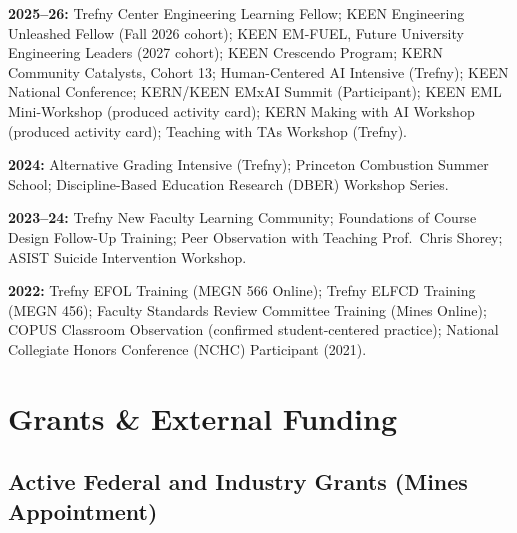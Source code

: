 \documentclass[11pt,letterpaper]{article}
\begin{document}
\noindent\textbf{2025--26:} Trefny Center Engineering Learning Fellow; KEEN Engineering
Unleashed Fellow (Fall 2026 cohort); KEEN EM-FUEL, Future University Engineering Leaders
(2027 cohort); KEEN Crescendo
Program; KERN Community Catalysts, Cohort 13; Human-Centered AI Intensive (Trefny); KEEN National Conference; KERN/KEEN
EMxAI Summit (Participant); KEEN EML Mini-Workshop (produced activity card); KERN Making
with AI Workshop (produced activity card); Teaching with TAs Workshop (Trefny).

\medskip
\noindent\textbf{2024:} Alternative Grading Intensive (Trefny); Princeton Combustion
Summer School; Discipline-Based Education Research (DBER) Workshop Series.

\medskip
\noindent\textbf{2023--24:} Trefny New Faculty Learning Community; Foundations of Course
Design Follow-Up Training; Peer Observation with Teaching Prof.\ Chris Shorey; ASIST
Suicide Intervention Workshop.

\medskip
\noindent\textbf{2022:} Trefny EFOL Training (MEGN 566 Online); Trefny ELFCD Training
(MEGN 456); Faculty Standards Review Committee Training (Mines Online); COPUS Classroom
Observation (confirmed student-centered practice); National Collegiate Honors Conference
(NCHC) Participant (2021).

\section{Grants \& External Funding}

\subsection{Active Federal and Industry Grants (Mines Appointment)}
\end{document}
